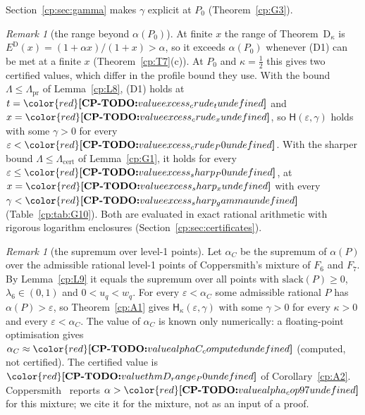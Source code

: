 \documentclass[11pt]{article}
\makeatletter
\theoremstyle{definition}
\theoremstyle{remark}
\newtheorem{remark}[theorem]{Remark}
\DeclareRobustCommand{\CPTODO}[1]{{\color{red}\textbf{[CP-TODO:} #1\textbf{]}}}
\providecommand{\eps}{\varepsilon}
\newcommand{\Hyp}{\mathsf{H}}                 %
\newcommand{\Hypk}[1]{\mathsf{H}_{#1}}        %
\newcommand{\Lam}{\Lambda}                    %
\newcommand{\Lampr}{\Lambda_{\mathrm{pr}}}    %
\newcommand{\Lamcert}{\Lambda_{\mathrm{cert}}}%
\newcommand{\Dcond}{\textup{(D1)}}            %
\newcommand{\ThmDk}{Theorem~D\texorpdfstring{\ensuremath{_\kappa}}{\_kappa}}     %
\newcommand{\Erange}[1]{E^{#1}}               %
\newcommand{\slack}{\mathrm{slack}}           %
\newcommand{\Pzero}{P_0}                      %
\newcommand{\cpv}[1]{\ifcsname cpv@#1\endcsname\csname cpv@#1\endcsname\else\CPTODO{value #1 undefined}\fi}
\makeatother
\begin{document}
Section~\ref{cp:sec:gamma} makes $\gamma$ explicit at $\Pzero$ (Theorem~\ref{cp:G3}).

\begin{remark}[the range beyond $\alpha(\Pzero)$]\label{cp:A3}
At finite $x$ the range of \ThmDk{} is $\Erange{\mathrm D}(x)=(1+\alpha x)/(1+x)>\alpha$, so it exceeds $\alpha(\Pzero)$ whenever \Dcond{} can be met at a finite $x$ (Theorem~\ref{cp:T7}(c)). At $\Pzero$ and $\kappa=\frac12$ this gives two certified values, which differ in the profile bound they use. With the bound $\Lam\le\Lampr$ of Lemma~\ref{cp:L8}, \Dcond{} holds at $t=\cpv{excess_crude_t}$ and $x=\cpv{excess_crude_x}$, so $\Hyp(\eps,\gamma)$ holds with some $\gamma>0$ for every $\eps<\cpv{excess_crude_P0}$. With the sharper bound $\Lam\le\Lamcert$ of Lemma~\ref{cp:G1}, it holds for every $\eps\le\cpv{excess_sharp_P0}$, at $x=\cpv{excess_sharp_x}$ with every $\gamma<\cpv{excess_sharp_gamma}$ (Table~\ref{cp:tab:G10}). Both are evaluated in exact rational arithmetic with rigorous logarithm enclosures (Section~\ref{cp:sec:certificates}).
\end{remark}

\begin{remark}[the supremum over level-1 points]\label{cp:A4}
Let $\alpha_C$ be the supremum of $\alpha(P)$ over the admissible rational level-1 points of Coppersmith's mixture of $F_6$ and $F_7$. By Lemma~\ref{cp:L9} it equals the supremum over all points with $\slack(P)\ge0$, $\lambda_6\in(0,1)$ and $0<u_q<w_q$. For every $\eps<\alpha_C$ some admissible rational $P$ has $\alpha(P)>\eps$, so Theorem~\ref{cp:A1} gives $\Hypk\kappa(\eps,\gamma)$ with some $\gamma>0$ for every $\kappa>0$ and every $\eps<\alpha_C$. The value of $\alpha_C$ is known only numerically: a floating-point optimisation gives $\alpha_C\approx\cpv{alphaC_computed}$ (computed, not certified). The certified value is $\cpv{thmD_range_P0}$ of Corollary~\ref{cp:A2}. Coppersmith~\cite{Cop97} reports $\alpha>\cpv{alpha_cop97}$ for this mixture; we cite it for the mixture, not as an input of a proof.
\end{remark}
\end{document}
